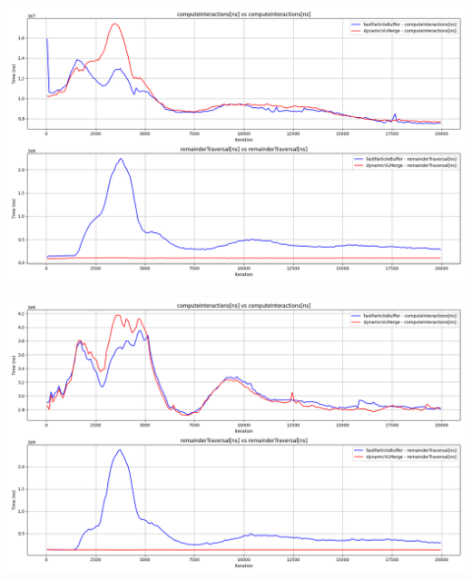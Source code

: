 
\begin{center}
\includegraphics[width=\linewidth]{graphs/fallingDrop/normalExperiments/iter/vclc06dvlfp.png}
\end{center}

\begin{center}
\includegraphics[width=\linewidth]{graphs/fallingDrop/normalExperiments/iter/vlc08dvlfp.png}
\end{center}

